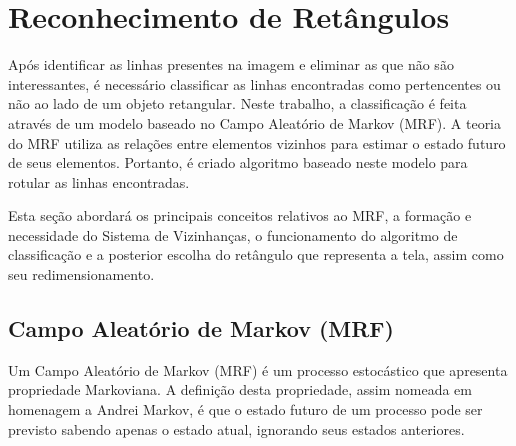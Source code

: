 \section{Reconhecimento de Retângulos} \label{met:retangulo}

Após identificar as linhas presentes na imagem e eliminar as que não são interessantes, é necessário classificar as linhas encontradas como pertencentes ou não ao lado de um objeto retangular. Neste trabalho, a classificação é feita através de um modelo baseado no Campo Aleatório de Markov (MRF). A teoria do MRF utiliza as relações entre elementos vizinhos para estimar o estado futuro de seus elementos. Portanto, é criado algoritmo baseado neste modelo para rotular as linhas encontradas.





Esta seção abordará os principais conceitos relativos ao MRF, a formação e necessidade do Sistema de Vizinhanças, o funcionamento do algoritmo de classificação e a posterior escolha do retângulo que representa a tela, assim como seu redimensionamento.

\subsection{Campo Aleatório de Markov (MRF)}

Um Campo Aleatório de Markov (MRF) é um processo estocástico que apresenta propriedade Markoviana. A definição desta propriedade, assim nomeada em homenagem a Andrei Markov, é que o estado futuro de um processo pode ser previsto sabendo apenas o estado atual, ignorando seus estados anteriores.

